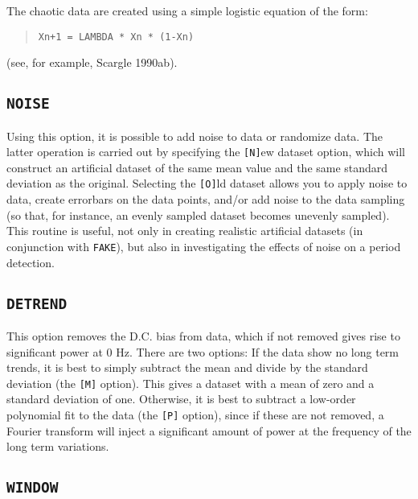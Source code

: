 The chaotic data are created using a simple logistic equation of the form:

\begin{quote}
{\tt Xn+1 = LAMBDA * Xn * (1-Xn)} 
\end{quote}

(see, for example, Scargle 1990ab).

\subsection*{\tt NOISE}

Using this option, it is possible to add noise to data or randomize data. The
latter operation is carried out by specifying the {\tt [N]}ew dataset option,
which will construct an artificial dataset of the same mean value and the same
standard deviation as the original. Selecting the {\tt [O]}ld dataset allows
you to apply noise to data, create errorbars on the data points, and/or add
noise to the data sampling (so that, for instance, an evenly sampled dataset
becomes unevenly sampled). This routine is useful, not only in creating
realistic artificial datasets (in conjunction with {\tt FAKE}), but also in
investigating the effects of noise on a period detection. 

\subsection*{\tt DETREND}

This option removes the D.C. bias from data, which if not removed gives rise to
significant power at 0 Hz. There are two options: If the data show no long term
trends, it is best to simply subtract the mean and divide by the standard
deviation (the {\tt [M]} option). This gives a dataset with a mean of zero and
a standard deviation of one. Otherwise, it is best to subtract a low-order
polynomial fit to the data (the {\tt [P]} option), since if these are not
removed, a Fourier transform will inject a significant amount of power at the
frequency of the long term variations. 

\subsection*{\tt WINDOW}

